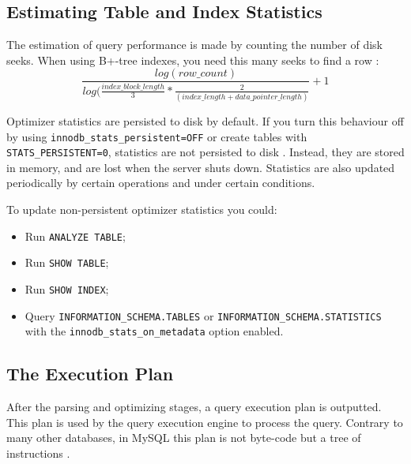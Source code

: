 \documentclass[12pt]{article}
\begin{document}
\subsection{Estimating Table and Index Statistics}
\label{estimativas}
The estimation of query performance is made by counting the number of disk seeks. When using B+-tree indexes, you need this many seeks to find a row \parencite{EstimatingPerformance}:
\begin{equation}
\frac{log(row\_count)}{log(\frac{index\_block\_length}{3} * \frac{2}{ (index\_length + data\_pointer\_length)}}
+ 1
\end{equation}


\vspace{0.3cm}

Optimizer statistics are persisted to disk by default. If you turn this behaviour off by using \verb|innodb_stats_persistent=OFF| or create tables with \verb|STATS_PERSISTENT=0|, statistics are not persisted to disk \parencite{InnoDBStatisctsEstimation}. Instead, they are stored in memory, and are lost when the server shuts down. Statistics are also updated periodically by certain operations and under certain conditions.

To update non-persistent optimizer statistics you could:
\begin{itemize}
    \item Run \verb|ANALYZE TABLE|;
    
    \item Run \verb|SHOW TABLE|;
    
    \item Run \verb|SHOW INDEX|;
    
    \item Query \verb|INFORMATION_SCHEMA.TABLES| or \verb|INFORMATION_SCHEMA.STATISTICS| with the \verb|innodb_stats_on_metadata| option enabled.

\end{itemize}



\subsection{The Execution Plan}
\label{executionPlan}
After the parsing and optimizing stages, a query execution plan is outputted. This plan is used by the query execution engine to process the query. Contrary to many other databases, in MySQL this plan is not byte-code but a tree of instructions \parencite{QueryOptimizationBook}.
\end{document}
